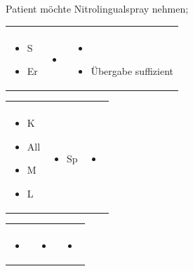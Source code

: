 \documentclass[
ngerman,
paper=a4,
asymmetric,
fontsize=9pt,
draft=false,
parskip=half,
footnotes=multiple,
toc=flat,
]{scrbook}
\newcommand{\DreiSpalten}[3]{
\begin{tabularx}{\linewidth}{XXX}
\TabSub{Anamnese}
&
\TabSub{Untersuchungen}
&
\TabSub{Maßnahmen}
\\
#1
&
#2
&
#3
\end{tabularx}
}
\begin{document}
{\begin{inparadesc}
  \item[Verlauf:] Patient möchte Nitrolingualspray nehmen; 
\end{inparadesc}
}{%
\DreiSpalten
{%
\begin{itemize}
  \item S
  \item Er
\end{itemize}
}{%
\begin{itemize}
  \item 
\end{itemize}
}{%
\begin{itemize}
  \item 
  \item Übergabe suffizient
\end{itemize}
}
}{%
\DreiSpalten
{%
\begin{itemize}
  \item K
  \item All
  \item M
  \item L
\end{itemize}
}{%
\begin{itemize}
  \item Sp\ce{O2}
\end{itemize}
}{%
\begin{itemize}
  \item 
\end{itemize}
}
}
{}
{%
\DreiSpalten
{%
\begin{itemize}
  \item 
\end{itemize}
}{%
\begin{itemize}
  \item 
\end{itemize}
}{%
\begin{itemize}
  \item 
\end{itemize}
}
}

\end{document}
